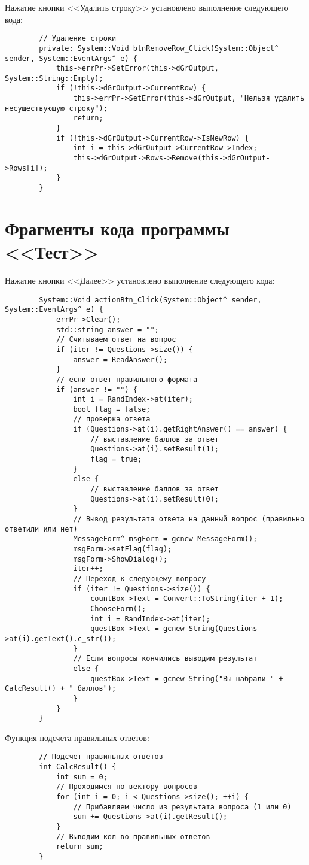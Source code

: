 Нажатие кнопки <<Удалить строку>> установлено выполнение следующего кода:

\begin{verbatim}
		// Удаление строки
		private: System::Void btnRemoveRow_Click(System::Object^ sender, System::EventArgs^ e) {
			this->errPr->SetError(this->dGrOutput, System::String::Empty);
			if (!this->dGrOutput->CurrentRow) {
				this->errPr->SetError(this->dGrOutput, "Нельзя удалить несуществующую строку");
				return;
			}
			if (!this->dGrOutput->CurrentRow->IsNewRow) {
				int i = this->dGrOutput->CurrentRow->Index;
				this->dGrOutput->Rows->Remove(this->dGrOutput->Rows[i]);
			}
		}
\end{verbatim}
\section{Фрагменты кода программы <<Тест>>}\label{app:task9}

Нажатие кнопки <<Далее>> установлено выполнение следующего кода:

\begin{verbatim}
		System::Void actionBtn_Click(System::Object^ sender, System::EventArgs^ e) {
			errPr->Clear();
			std::string answer = "";
			// Считываем ответ на вопрос
			if (iter != Questions->size()) {
				answer = ReadAnswer();
			}
			// если ответ правильного формата
			if (answer != "") {
				int i = RandIndex->at(iter);
				bool flag = false;
				// проверка ответа
				if (Questions->at(i).getRightAnswer() == answer) {
					// выставление баллов за ответ
					Questions->at(i).setResult(1);
					flag = true;
				}
				else {
					// выставление баллов за ответ
					Questions->at(i).setResult(0);
				}
				// Вывод результата ответа на данный вопрос (правильно ответили или нет)
				MessageForm^ msgForm = gcnew MessageForm();
				msgForm->setFlag(flag);
				msgForm->ShowDialog();
				iter++;
				// Переход к следующему вопросу
				if (iter != Questions->size()) {
					countBox->Text = Convert::ToString(iter + 1);
					ChooseForm();
					int i = RandIndex->at(iter);
					questBox->Text = gcnew String(Questions->at(i).getText().c_str());
				}
				// Если вопросы кончились выводим результат
				else {
					questBox->Text = gcnew String("Вы набрали " + CalcResult() + " баллов");
				}
			}
		}
\end{verbatim}

Функция подсчета правильных ответов:

\begin{verbatim}
		// Подсчет правильных ответов
		int CalcResult() {
			int sum = 0;
			// Проходимся по вектору вопросов
			for (int i = 0; i < Questions->size(); ++i) {
				// Прибавляем число из результата вопроса (1 или 0)
				sum += Questions->at(i).getResult();
			}
			// Выводим кол-во правильных ответов
			return sum;
		}
\end{verbatim}
